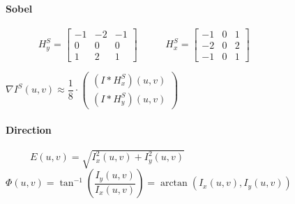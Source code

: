\documentclass[10pt,a4paper]{report}
\begin{document}
	\paragraph{Sobel} ~\newline
	~\newline
	~\newline
	~\newline
	$H^S_y = \begin{bmatrix}
	-1 & -2 & -1 \\ 0 & 0 & 0 \\ 1 & 2 & 1
	\end{bmatrix} $
	~\newline
	~\newline
	~\newline
	$H^S_x = \begin{bmatrix}
	-1 & 0 & 1 \\ -2 & 0 & 2 \\ -1 & 0 & 1
	\end{bmatrix} $
	
	$\nabla I^S(u,v)\approx \dfrac{1}{8} \cdot \begin{pmatrix}
	(I\ast H^S_x)(u,v) \\ (I\ast H^S_y)(u,v) 
	\end{pmatrix}$
	
	\paragraph{Direction} 
	~\newline
	~\newline
	~\newline
	$E(u,v) = \sqrt{I_x^2(u,v)+I_y^2(u,v)}$
	~\newline
	~\newline
	~\newline
	$\Phi(u,v)=\tan^{-1}\left(\dfrac{I_y(u,v)}{I_x(u,v)}\right)=\arctan(I_x(u,v),I_y(u,v))$
\end{document}
